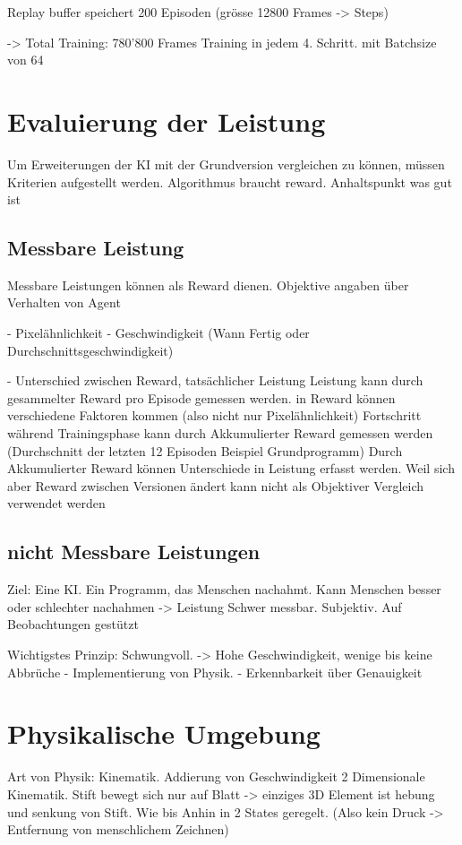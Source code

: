     Replay buffer speichert 200 Episoden (grösse 12800 Frames -> Steps)

    -> Total Training: 780'800 Frames
    Training in jedem 4. Schritt. mit Batchsize von 64



\section{Evaluierung der Leistung}
    Um Erweiterungen der KI mit der Grundversion vergleichen zu können, müssen Kriterien aufgestellt werden. 
    Algorithmus braucht reward. Anhaltspunkt was gut ist
    
    \subsection*{Messbare Leistung}
    Messbare Leistungen können als Reward dienen. Objektive angaben über Verhalten von Agent
    
    - Pixelähnlichkeit
    - Geschwindigkeit (Wann Fertig oder Durchschnittsgeschwindigkeit)
    
    - Unterschied zwischen Reward, tatsächlicher Leistung
      Leistung kann durch gesammelter Reward pro Episode gemessen werden. in Reward können verschiedene Faktoren kommen (also nicht nur Pixelähnlichkeit)
      Fortschritt während Trainingsphase kann durch Akkumulierter Reward gemessen werden (Durchschnitt der letzten 12 Episoden Beispiel Grundprogramm)
      Durch Akkumulierter Reward können Unterschiede in Leistung erfasst werden. Weil sich aber Reward zwischen Versionen ändert kann nicht als Objektiver Vergleich verwendet werden
    
    \subsection*{nicht Messbare Leistungen}
    Ziel: Eine KI. Ein Programm, das Menschen nachahmt. 
    Kann Menschen besser oder schlechter nachahmen -> Leistung
    Schwer messbar. Subjektiv. Auf Beobachtungen gestützt
    
    Wichtigstes Prinzip: Schwungvoll. -> Hohe Geschwindigkeit, wenige bis keine Abbrüche
        - Implementierung von Physik. 
        - Erkennbarkeit über Genauigkeit


\section{Physikalische Umgebung}
Art von Physik: Kinematik. Addierung von Geschwindigkeit 2 Dimensionale
Kinematik. Stift bewegt sich nur auf Blatt -> einziges 3D Element ist hebung und
senkung von Stift. Wie bis Anhin in 2 States geregelt. (Also kein Druck -> Entfernung von menschlichem Zeichnen)

